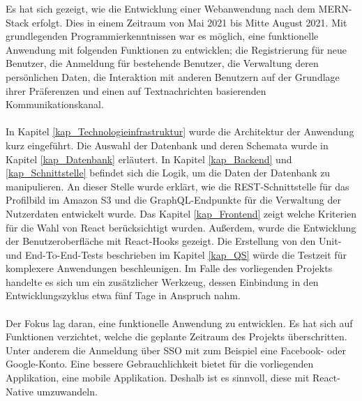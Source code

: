 Es hat sich gezeigt, wie die Entwicklung einer Webanwendung nach dem MERN-Stack erfolgt. Dies in einem Zeitraum von Mai 2021 bis Mitte August 2021. Mit grundlegenden Programmierkenntnissen war es möglich, eine funktionelle Anwendung mit folgenden Funktionen zu entwicklen; die Registrierung für neue Benutzer, die Anmeldung für bestehende Benutzer, die Verwaltung deren persönlichen Daten, die Interaktion mit anderen Benutzern auf der Grundlage ihrer Präferenzen und einen auf Textnachrichten basierenden Kommunikationskanal.
\\\\
In Kapitel \ref{kap_Technologieinfrastruktur} wurde die Architektur der Anwendung kurz eingeführt. %
Die Auswahl der Datenbank und deren Schemata wurde in Kapitel \ref{kap_Datenbank} erläutert. In Kapitel \ref{kap_Backend} und \ref{kap_Schnittstelle} befindet sich die Logik, um die Daten der Datenbank zu manipulieren. An dieser Stelle wurde erklärt, wie die REST-Schnittstelle für das Profilbild im Amazon S3 und die GraphQL-Endpunkte für die Verwaltung der Nutzerdaten entwickelt wurde.  
Das Kapitel \ref{kap_Frontend} zeigt welche Kriterien für die Wahl von React berücksichtigt wurden. Außerdem, wurde die Entwicklung der Benutzeroberfläche mit React-Hooks gezeigt. 
Die Erstellung von den Unit- und End-To-End-Tests beschrieben im Kapitel \ref{kap_QS} würde die Testzeit für komplexere Anwendungen beschleunigen. Im Falle des vorliegenden Projekts handelte es sich um ein zusätzlicher Werkzeug, dessen Einbindung in den Entwicklungszyklus etwa fünf Tage in Anspruch nahm. %
\\\\
Der Fokus lag daran, eine funktionelle Anwendung zu entwicklen. Es hat sich auf Funktionen verzichtet, welche die geplante Zeitraum des Projekts überschritten. Unter anderem die Anmeldung über SSO mit zum Beispiel eine Facebook- oder Google-Konto. %
Eine bessere Gebrauchlichkeit %
bietet für die vorliegenden Applikation, eine mobile Applikation. Deshalb ist es sinnvoll, diese mit React-Native umzuwandeln.